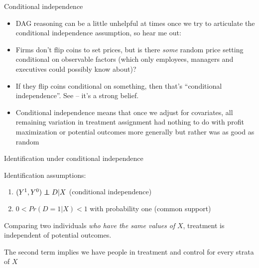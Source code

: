 \documentclass{beamer}
\newcommand\independent{\protect\mathpalette{\protect\independenT}{\perp}}
\def\independenT#1#2{\mathrel{\rlap{$#1#2$}\mkern2mu{#1#2}}}
\begin{document}
\begin{frame}{Conditional independence}

\begin{itemize}
\item DAG reasoning can be a little unhelpful at times once we try to articulate the conditional independence assumption, so hear me out:
\item Firms don't flip coins to set prices, but is there \emph{some} random price setting conditional on observable factors (which only employees, managers and executives could possibly know about)? 
\item If they flip coins conditional on something, then that's ``conditional independence''. See -- it's a strong belief.  
\item Conditional independence means that once we adjust for covariates, all remaining variation in treatment assignment had nothing to do with profit maximization or potential outcomes more generally but rather was as good as random
\end{itemize}

\end{frame}

\begin{frame}{Identification under conditional independence}
	
Identification assumptions:
  \begin{enumerate}
		\item $(Y^1,Y^0) \independent{D} | X$ (conditional independence)
		\item $0<Pr(D=1|X)<1$ with probability one (common support)
  \end{enumerate}

\bigskip
Comparing two individuals \emph{who have the same values of} $X$, treatment is independent of potential outcomes. 

\bigskip

The second term implies we have people in treatment and control for every strata of $X$
\end{frame}
\end{document}
